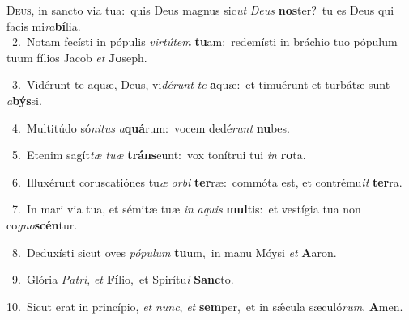 \lettrine{\initial\textcolor{\initialcolor}{D}}{eus,} in sancto via tua:~\dagger quis Deus magnus sic\textit{ut} \textit{De}\-\textit{us} \textbf{nos}\-ter?~\star tu es Deus qui facis mi\-\textit{ra}\-\textbf{bí}lia.\\
{\numbfont\textcolor{\numbcolor}{~2.}}~Notam fecísti in pópulis \textit{vir}\-\textit{tú}\textit{tem} \textbf{tu}\-am:~\star redemísti in bráchio tuo pópulum tuum fílios Jacob \textit{et} \textbf{Jo}\-seph.\par
{\numbfont\textcolor{\numbcolor}{~3.}}~Vidérunt te aquæ, Deus, vi\-\textit{dé}\-\textit{runt} \textit{te} \textbf{a}\-quæ:~\star et timuérunt et turbátæ sunt \textit{a}\-\textbf{býs}si.\par
{\numbfont\textcolor{\numbcolor}{~4.}}~Multitúdo só\-\textit{ni}\-\textit{tus} \textit{a}\-\textbf{quá}rum:~\star vocem dedé\textit{runt} \textbf{nu}\-bes.\par
{\numbfont\textcolor{\numbcolor}{~5.}}~Etenim sagít\textit{tæ} \textit{tu}\-\textit{æ} \textbf{tráns}\-eunt:~\star vox tonítrui tui \textit{in} \textbf{ro}\-ta.\par
{\numbfont\textcolor{\numbcolor}{~6.}}~Illuxérunt coruscatiónes tu\textit{æ} \textit{or}\-\textit{bi} \textbf{ter}\-ræ:~\star commóta est, et contrému\textit{it} \textbf{ter}\-ra.\par
{\numbfont\textcolor{\numbcolor}{~7.}}~In mari via tua, et sémitæ tuæ \textit{in} \textit{a}\-\textit{quis} \textbf{mul}\-tis:~\star et vestígia tua non co\-\textit{gno}\-\textbf{scén}tur.\par
{\numbfont\textcolor{\numbcolor}{~8.}}~Deduxísti sicut oves \textit{pó}\-\textit{pu}\textit{lum} \textbf{tu}\-um,~\star in manu Móysi \textit{et} \textbf{A}\-aron.\par
{\numbfont\textcolor{\numbcolor}{~9.}}~Glória \textit{Pa}\-\textit{tri}, \textit{et} \textbf{Fí}\-lio,~\star et Spirítu\textit{i} \textbf{Sanc}\-to.\par
{\numbfont\textcolor{\numbcolor}{10.}}~Sicut erat in princípio, \textit{et} \textit{nunc}\-, \textit{et} \textbf{sem}\-per,~\star et in sǽcula sæculó\-\textit{rum}\-. \textbf{A}\-men.\par
